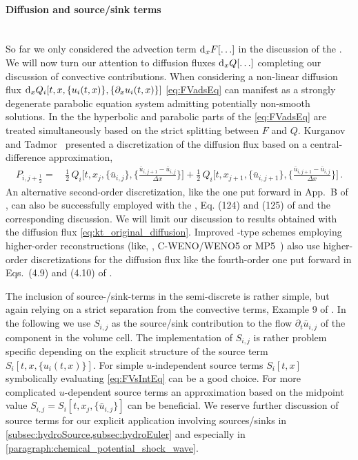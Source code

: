 \paragraph{Diffusion and source/sink terms}\label{paragraph:KTQS}\mbox{} \\
So far we only considered the advection term $\difx\! F[\ldots]$ in the discussion of the \ktScheme{}.
We will now turn our attention to diffusion fluxes $\difx\! Q[\ldots]$ completing our discussion of convective contributions.
When considering a non-linear diffusion flux $\difx\! Q_i [ t, x, \{u_i ( t, x )\}, \{\partial_x u_i ( t, x )\} ]$ \cref{eq:FVadsEq} can manifest as a strongly degenerate parabolic equation system admitting potentially non-smooth solutions.
In the \ktScheme{} the hyperbolic and parabolic parts of the \pde{} \eqref{eq:FVadsEq} are treated simultaneously based on the strict splitting between $F$ and $Q$.
Kurganov and Tadmor~\cite{KTO2-0} presented a discretization of the diffusion flux based on a central-difference approximation,
\begin{align}
	 P_{i,j + \frac{1}{2}} = \, & \tfrac{1}{2}\, Q_i \Big[ t, x_j, \big\{\bar{u}_{i,j}\big\},  \big\{\tfrac{\bar{u}_{i,j + 1} - \bar{u}_{i,j}}{\Delta x} \big\}\Big] + \tfrac{1}{2}\, Q_i \Big[ t, x_{j + 1}, \big\{\bar{u}_{i,j+1}\big\}, \big\{ \tfrac{\bar{u}_{i,j + 1} - \bar{u}_{i,j}}{\Delta x} \big\}\Big] \, .	\label{eq:kt_original_diffusion}
\end{align}
An alternative second-order discretization, like the one put forward in App.~B of , can also be successfully employed with the \ktScheme{}, \cf{} Eq. (124) and (125) of  and the corresponding discussion.
We will limit our discussion to results obtained with the diffusion flux \eqref{eq:kt_original_diffusion}.
Improved \kt-type schemes employing higher-order reconstructions (like, \eg{}, C-WENO/WENO5 or MP5~\cite{KTO3-0,KTO5-0,KT-MP5}) also use higher-order discretizations for the diffusion flux like the fourth-order one put forward in Eqs.~(4.9) and (4.10) of .\bigskip

The inclusion of source-/sink-terms in the semi-discrete \ktScheme{} is rather simple, but again relying on a strict separation from the convective terms, \cf{} Example 9 of .
In the following we use $S_{i,j}$ as the source/sink contribution to the flow $\partial_t \bar{u}_{i,j}$ of the  component in the  volume cell.
The implementation of $S_{i,j}$ is rather problem specific depending on the explicit structure of the source term $S_i [ t, x, \{u_i ( t, x )\} ]$.
For simple $u$-independent source terms $S_i [ t, x]$ symbolically evaluating \cref{eq:FVsIntEq} can be a good choice.
For more complicated $u$-dependent source terms an approximation based on the midpoint value $S_{i,j}=S_i [ t, x_j, \{\bar{u}_{i,j}\} ]$ can be beneficial.
We reserve further discussion of source terms for our explicit application involving sources/sinks in \cref{subsec:hydroSource,subsec:hydroEuler} and especially in \cref{paragraph:chemical_potential_shock_wave}.

